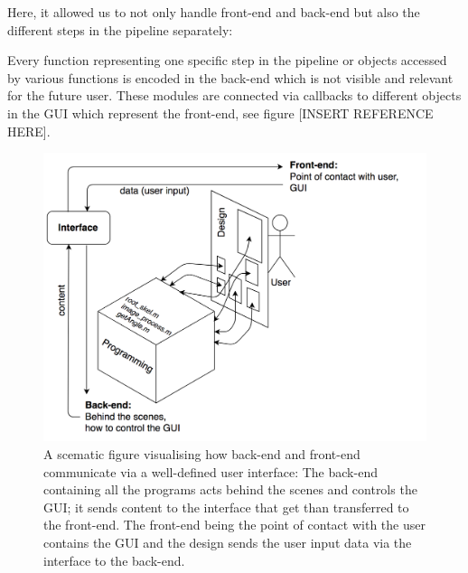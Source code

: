 
Here, it allowed us to not only handle front-end and back-end but also the different steps in the pipeline separately: 

Every function representing one specific step in the pipeline or objects accessed by various functions is encoded in the back-end which is not visible and relevant for the future user. These modules are connected via callbacks to different objects in the GUI which represent the front-end, see figure [INSERT REFERENCE HERE].


\begin{figure}[H]
	\centering
	\includegraphics[width=1.\textwidth]{../Figures/frontBack.png}
	\caption{A scematic figure visualising how back-end and front-end communicate via a well-defined user interface: The back-end containing all the programs acts behind the scenes and controls the GUI; it sends content to the interface that get than transferred to the front-end. The front-end being the point of contact with the user contains the GUI and the design sends the user input data via the interface to the back-end.}
	\label{fig:fronendBackend}
\end{figure}


